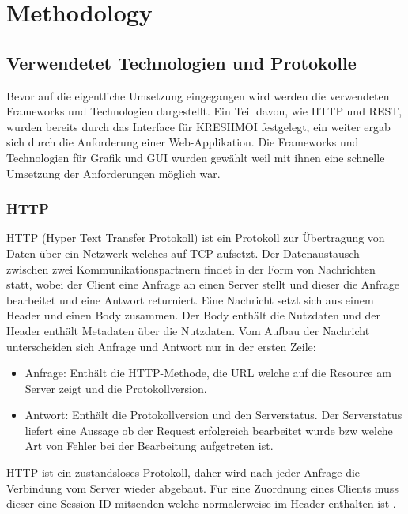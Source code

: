 
\section{Methodology}
\label{sec:methodology}

\subsection{Verwendetet Technologien und Protokolle}
\label{sec:Verwendetet Technologien}
Bevor auf die eigentliche Umsetzung eingegangen wird werden die verwendeten Frameworks und Technologien dargestellt.
Ein Teil davon, wie HTTP und REST, wurden bereits durch das Interface für KRESHMOI festgelegt, 
ein weiter ergab sich durch die Anforderung einer Web-Applikation.
Die Frameworks und Technologien für Grafik und GUI wurden gewählt weil mit ihnen eine schnelle Umsetzung der Anforderungen möglich war.

\subsubsection{HTTP}
\label{sec:HTTP}
HTTP (Hyper Text Transfer Protokoll) ist ein Protokoll zur Übertragung von Daten über ein Netzwerk welches auf TCP aufsetzt.
Der Datenaustausch zwischen zwei Kommunikationspartnern findet in der Form von Nachrichten statt, 
wobei der Client eine Anfrage an einen Server stellt und dieser die Anfrage bearbeitet und eine Antwort returniert.
%
Eine Nachricht setzt sich aus einem Header und einen Body zusammen.
Der Body enthält die Nutzdaten und der Header enthält Metadaten über die Nutzdaten.
Vom Aufbau der Nachricht unterscheiden sich Anfrage und Antwort nur in der ersten Zeile:
\begin{itemize}
	\item Anfrage: Enthält die HTTP-Methode, die URL welche auf die Resource am Server zeigt und die Protokollversion.
	\item Antwort: Enthält die Protokollversion und den Serverstatus. 
		Der Serverstatus liefert eine Aussage ob der Request erfolgreich bearbeitet wurde bzw welche Art von Fehler bei der Bearbeitung aufgetreten ist.
\end{itemize}
HTTP ist ein zustandsloses Protokoll, daher wird nach jeder Anfrage die Verbindung vom Server wieder abgebaut.
Für eine Zuordnung eines Clients muss dieser eine Session-ID mitsenden welche normalerweise im Header enthalten ist \cite{http}.

